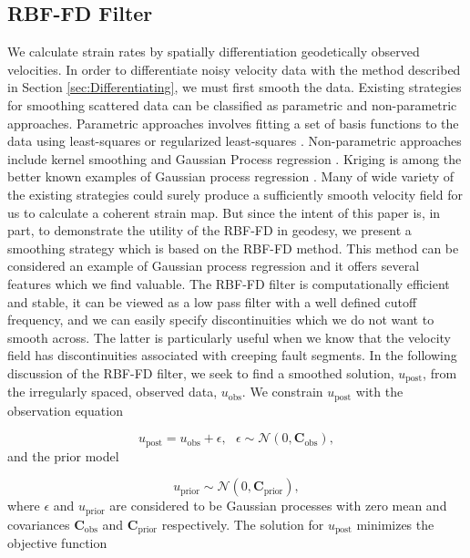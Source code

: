 \documentclass[10pt,a4paper]{article}
\begin{document}
\subsection{RBF-FD Filter}\label{sec:Filter}
We calculate strain rates by spatially differentiation geodetically observed velocities.  In order to differentiate noisy velocity data with the method described in Section \ref{sec:Differentiating}, we must first smooth the data. Existing strategies for smoothing scattered data can be classified as parametric and non-parametric approaches.  Parametric approaches involves fitting a set of basis functions to the data using least-squares or regularized least-squares \citep[e.g.][]{Fasshauer2007}. Non-parametric approaches include kernel smoothing \citep[e.g.][]{Hastie1990} and Gaussian Process regression \citep[e.g.][]{Rasmussen2006}. Kriging is among the better known examples of Gaussian process regression \citep{Matheron1963}.  Many of wide variety of the existing strategies could surely produce a sufficiently smooth velocity field for us to calculate a coherent strain map. But since the intent of this paper is, in part, to demonstrate the utility of the RBF-FD in geodesy, we present a smoothing strategy which is based on the RBF-FD method.  This method can be considered an example of Gaussian process regression and it offers several features which we find valuable.  The RBF-FD filter is computationally efficient and stable, it can be viewed as a low pass filter with a well defined cutoff frequency, and we can easily specify discontinuities which we do not want to smooth across.  The latter is particularly useful when we know that the velocity field has discontinuities associated with creeping fault segments. In the following discussion of the RBF-FD filter, we seek to find a smoothed solution, $u_\mathrm{post}$, from the irregularly spaced, observed data, $u_\mathrm{obs}$. We constrain $u_\mathrm{post}$ with the observation equation

\begin{equation}\label{eq:Data}
  u_\mathrm{post} = u_\mathrm{obs} + \epsilon,\ \ \ \epsilon \sim \mathcal{N}(0,\mathbf{C}_\mathrm{obs}),
\end{equation}
and the prior model

\begin{equation}\label{eq:Prior}
  u_\mathrm{prior} \sim \mathcal{N}(0,\mathbf{C}_\mathrm{prior}),
\end{equation}
where $\epsilon$ and $u_\mathrm{prior}$ are considered to be Gaussian processes with zero mean and covariances $\mathbf{C}_\mathrm{obs}$ and $\mathbf{C}_\mathrm{prior}$ respectively.  The solution for $u_\mathrm{post}$ minimizes the objective function  
\end{document}
